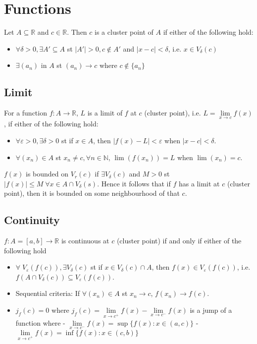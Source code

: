 \documentclass{article}
\begin{document}
\section{Functions}

Let $A \subseteq \mathbb{R}$ and $c \in \mathbb{R}$. Then $c$ is a cluster point of $A$ if either of the following hold:
\begin{itemize}
	\item $\forall \delta > 0, \exists A' \subseteq A$ st $|A'| > 0, c \notin A'$ and $|x-c| < \delta$, i.e. $x \in V_\delta(c)$
	\item $\exists (a_n)$ in $A$ st $(a_n) \rightarrow c$ where $c \notin \{a_n\}$
\end{itemize}

\subsection{Limit}

For a function $f: A \rightarrow \mathbb{R}$,  $L$ is a limit of $f$ at $c$ (cluster point), i.e. $L = \lim\limits_{x \rightarrow c} f(x)$, if either of the following hold:
\begin{itemize}
	\item $\forall \varepsilon > 0, \exists \delta > 0$ st if $x \in A$, then $|f(x)-L| < \varepsilon$ when $|x-c| < \delta$.
	\item $\forall (x_n) \in A$ st $x_n \not= c, \forall n \in \mathbb{N}$, $\lim(f(x_n)) = L$ when $\lim(x_n) = c$.
\end{itemize}

$f(x)$ is bounded on $V_r(c)$ if $\exists V_\delta(c)$ and $M > 0$ st $|f(x)| \leq M \; \forall x \in A \cap V_\delta(s)$. Hence it follows that if $f$ has a limit at $c$ (cluster point), then it is bounded on some neighbourhood of that $c$.

\subsection{Continuity}

$f: A=[a,b] \rightarrow \mathbb{R}$ is continuous at $c$ (cluster point) if and only if either of the following hold
\begin{itemize}
	\item $\forall \; V_\varepsilon (f(c)), \exists V_\delta(c)$ st if $x \in V_\delta(c) \cap A$, then $f(x) \in V_\varepsilon(f(c))$, i.e. $f(A\cap V_\delta(c)) \subseteq V_\varepsilon (f(c))$.
	\item Sequential criteria: If $\forall (x_n) \in A$ st $x_n \rightarrow c$, $f(x_n) \rightarrow f(c)$.
	\item $j_f(c) = 0$ where $j_f(c) = \lim\limits_{x \rightarrow c^+} f(x) - \lim\limits_{x \rightarrow c^-} f(x)$ is a jump of a function where
		\subitem - $\lim\limits_{x \rightarrow c^-} f(x) = \sup \{f(x): x \in (a,c)\}$ 
		\subitem - $\lim\limits_{x \rightarrow c^+} f(x) = \inf \{f(x): x \in (c,b)\}$
\end{itemize}
\end{document}
